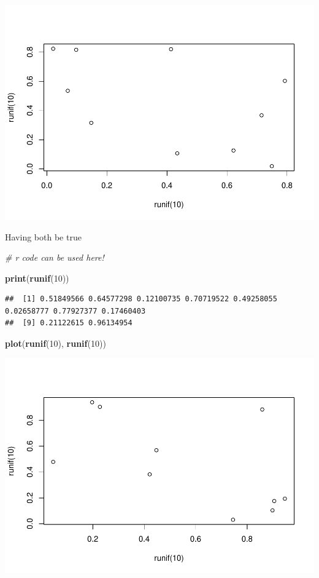 \documentclass[
]{article}
\newenvironment{Shaded}{\begin{snugshade}}{\end{snugshade}}
\newcommand{\CommentTok}[1]{\textcolor[rgb]{0.56,0.35,0.01}{\textit{#1}}}
\newcommand{\DecValTok}[1]{\textcolor[rgb]{0.00,0.00,0.81}{#1}}
\newcommand{\FunctionTok}[1]{\textcolor[rgb]{0.13,0.29,0.53}{\textbf{#1}}}
\newcommand{\NormalTok}[1]{#1}
\begin{document}
\includegraphics{FirstMarkdown_files/figure-latex/unnamed-chunk-1-1.pdf}

Having both be true

\begin{Shaded}
\begin{Highlighting}[]
\CommentTok{\# r code can be used here! }

\FunctionTok{print}\NormalTok{(}\FunctionTok{runif}\NormalTok{(}\DecValTok{10}\NormalTok{))}
\end{Highlighting}
\end{Shaded}

\begin{verbatim}
##  [1] 0.51849566 0.64577298 0.12100735 0.70719522 0.49258055 0.02658777 0.77927377 0.17460403
##  [9] 0.21122615 0.96134954
\end{verbatim}

\begin{Shaded}
\begin{Highlighting}[]
\FunctionTok{plot}\NormalTok{(}\FunctionTok{runif}\NormalTok{(}\DecValTok{10}\NormalTok{), }\FunctionTok{runif}\NormalTok{(}\DecValTok{10}\NormalTok{))}
\end{Highlighting}
\end{Shaded}

\includegraphics{FirstMarkdown_files/figure-latex/unnamed-chunk-2-1.pdf}
\end{document}
